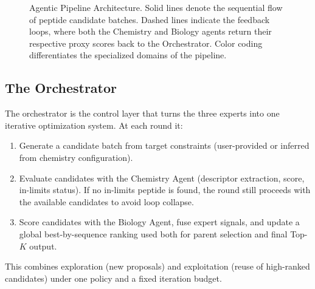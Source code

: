 \begin{figure}[t]
{
}
\caption{Agentic Pipeline Architecture. Solid lines denote the sequential flow of peptide candidate batches. Dashed lines indicate the feedback loops, where both the Chemistry and Biology agents return their respective proxy scores back to the Orchestrator. Color coding differentiates the specialized domains of the pipeline.}
\label{fig:pipeline_professional_colored}
\end{figure}

\subsection{The Orchestrator}\label{subsec:orchestrator}
The orchestrator is the control layer that turns the three experts into one iterative optimization system. At each round it:
\begin{enumerate}
	\item Generate a candidate batch from target constraints (user-provided or inferred from chemistry configuration).
	\item Evaluate candidates with the Chemistry Agent (descriptor extraction, score, in-limits status). If no in-limits peptide is found, the round still proceeds with the available candidates to avoid loop collapse.
	\item Score candidates with the Biology Agent, fuse expert signals, and update a global best-by-sequence ranking used both for parent selection and final Top-$K$ output.
\end{enumerate}
This combines exploration (new proposals) and exploitation (reuse of high-ranked candidates) under one policy and a fixed iteration budget.

